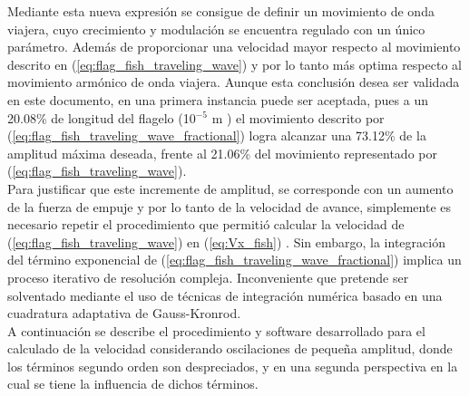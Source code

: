 Mediante esta nueva expresión se consigue de definir un movimiento de onda viajera, cuyo crecimiento y modulación se encuentra regulado con un único parámetro. Además de proporcionar una velocidad mayor respecto al movimiento descrito en (\ref{eq:flag_fish_traveling_wave}) y por lo tanto más optima respecto al movimiento armónico de onda viajera. Aunque esta conclusión desea ser validada en este documento, en una primera instancia puede ser aceptada, pues a un 20.08\% de longitud del flagelo (10$^{-5}$ m ) el movimiento descrito por (\ref{eq:flag_fish_traveling_wave_fractional}) logra alcanzar una 73.12\% de la amplitud máxima deseada, frente al 21.06\% del movimiento representado por (\ref{eq:flag_fish_traveling_wave}).\\

Para justificar que este incremente de amplitud, se corresponde con un aumento de la fuerza de empuje y por lo tanto de la velocidad de avance, simplemente es necesario repetir el procedimiento que permitió calcular la velocidad de (\ref{eq:flag_fish_traveling_wave}) en (\ref{eq:Vx_fish}) \cite{gray1955propulsion}. Sin embargo, la integración del término exponencial de (\ref{eq:flag_fish_traveling_wave_fractional}) implica un proceso iterativo de resolución compleja. Inconveniente que pretende ser solventado mediante el uso de técnicas de integración numérica basado en una cuadratura adaptativa de Gauss-Kronrod.\\

A continuación se describe el procedimiento y software desarrollado para el calculado de la velocidad considerando oscilaciones de pequeña amplitud, donde los términos segundo orden son despreciados, y en una segunda perspectiva en la cual se tiene la influencia de dichos términos.



